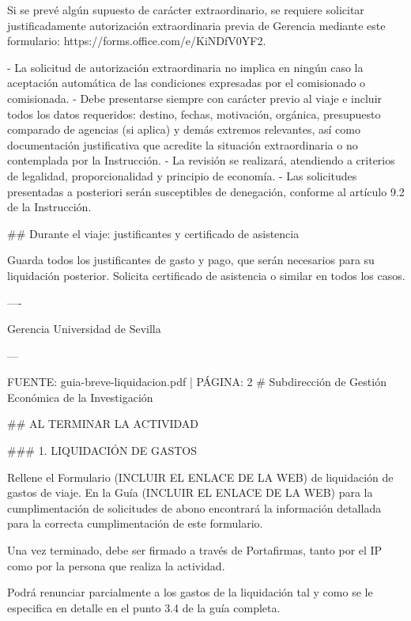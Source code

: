 \documentclass{article}
\begin{document}
\begin{itemize}
\begin{itemize}
\begin{scriptsize}
                  Si se prevé algún supuesto de carácter extraordinario, se requiere solicitar justificadamente autorización extraordinaria previa de Gerencia mediante este formulario: https://forms.office.com/e/KiNDfV0YF2.

                  - La solicitud de autorización extraordinaria no implica en ningún caso la aceptación automática de las condiciones expresadas por el comisionado o comisionada.
                  - Debe presentarse siempre con carácter previo al viaje e incluir todos los datos requeridos: destino, fechas, motivación, orgánica, presupuesto comparado de agencias (si aplica) y demás extremos relevantes, así como documentación justificativa que acredite la situación extraordinaria o no contemplada por la Instrucción.
                  - La revisión se realizará, atendiendo a criterios de legalidad, proporcionalidad y principio de economía.
                  - Las solicitudes presentadas a posteriori serán susceptibles de denegación, conforme al artículo 9.2 de la Instrucción.

                  \#\# Durante el viaje: justificantes y certificado de asistencia

                  Guarda todos los justificantes de gasto y pago, que serán necesarios para su liquidación posterior. Solicita certificado de asistencia o similar en todos los casos.

                  ----

                  Gerencia
                  Universidad de Sevilla

                  ---

                  FUENTE: guia-breve-liquidacion.pdf | PÁGINA: 2
                  \# Subdirección de Gestión Económica de la Investigación

                  \#\# AL TERMINAR LA ACTIVIDAD

                  \#\#\# 1. LIQUIDACIÓN DE GASTOS

                  Rellene el Formulario (INCLUIR EL ENLACE DE LA WEB) de liquidación de gastos de viaje. En la Guía (INCLUIR EL ENLACE DE LA WEB) para la cumplimentación de solicitudes de abono encontrará la información detallada para la correcta cumplimentación de este formulario.

                  Una vez terminado, debe ser firmado a través de Portafirmas, tanto por el IP como por la persona que realiza la actividad.

                  Podrá renunciar parcialmente a los gastos de la liquidación tal y como se le especifica en detalle en el punto 3.4 de la guía completa.


\end{scriptsize}
\end{itemize}
\end{itemize}
\end{document}
